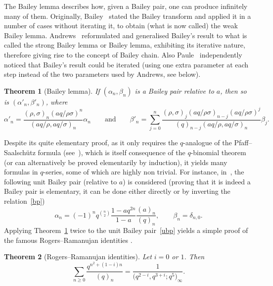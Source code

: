 \documentclass[pdftex]{sigma}
\numberwithin{equation}{section}
\newtheorem{Theorem}{Theorem}[section]
\begin{document}
The Bailey lemma describes how, given a Bailey pair, one can produce infinitely many of them. Originally, Bailey~\cite{Ba} stated the Bailey transform and applied
it in a number of cases without iterating it, to obtain (what
is now called) the weak Bailey lemma. Andrews~\cite{A1} reformulated and generalised Bailey's result to what is called the strong Bailey lemma or Bailey lemma, exhibiting its iterative nature, therefore giving rise to the concept of Bailey chain. Also Paule~\cite{P} independently noticed that Bailey's result could be iterated (using one extra parameter at each step instead of the two parameters used by Andrews, see below).
\begin{Theorem}[Bailey lemma]\label{thm:baileylemma}
If $(\alpha_n, \beta_n)$ is a Bailey pair relative to $a$, then so is $(\alpha'_n, \beta'_n)$, where
\begin{equation*}\alpha'_n=\frac{(\rho,\sigma)_n(aq/\rho\sigma)^n}{(aq/\rho,aq/\sigma)_n} \alpha_n \qquad\mbox{and}\qquad\beta'_n=\sum_{j=0}^n\frac{(\rho,\sigma)_j(aq/\rho\sigma)_{n-j}(aq/\rho\sigma)^j}{(q)_{n-j}(aq/\rho,aq/\sigma)_n} \beta_j.
\end{equation*}
\end{Theorem}
Despite its quite elementary proof, as it only requires the $q$-analogue of the Pfaff--Saalsch\"utz formula (see~\cite[formula~(II.12)]{GR}), which is itself consequence of the $q$-binomial theorem (or can alternatively be proved elementarily by induction), it yields many formulas in $q$-series, some of which are highly non trivial. For instance, in~\cite[equations (2.12) and (2.13)]{A1}, the following unit Bailey pair (relative to $a$) is considered (proving that it is indeed a Bailey pair is elementary, it can be done either directly or by inverting the relation~\eqref{bp})
\begin{equation}\label{ubp}
\alpha_n=(-1)^nq^{\binom{n}{2}}\frac{1-aq^{2n}}{1-a}\frac{(a)_n}{(q)_n},\qquad \beta_n=\delta_{n,0}.
\end{equation}
Applying Theorem~\ref{thm:baileylemma} twice to the unit Bailey pair~\eqref{ubp} yields a simple proof of the famous Rogers--Ramanujan identities \cite{RR19}.

\begin{Theorem}[Rogers--Ramanujan identities]\label{th:RR}
Let $i=0$ or $1$. Then
\begin{equation*}
 \sum_{n \geq 0} \frac{q^{n^2+ (1-i)n}}{(q)_n} = \frac{1}{\bigl(q^{2-i},q^{3+i};q^5\bigr)_{\infty}}.
\end{equation*}
\end{Theorem}
\end{document}
